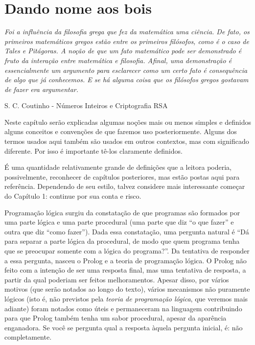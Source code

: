 \documentclass{article}
\begin{document}
\section{Dando nome aos bois}

\epigraph{\textit{Foi a influência da filosofia grega que fez da matemática uma ciência. De fato, os primeiros matemáticos gregos estão entre os primeiros filósofos, como é o caso de Tales e Pitágoras. A noção de que um fato matemático pode ser demonstrado é fruto da interação entre matemática e filosofia. Afinal, uma demonstração é essencialmente um argumento para esclarecer como um certo fato é consequência de algo que já conhecemos. E se há alguma coisa que os filósofos gregos gostavam de
    fazer era argumentar.}}{S. C. Coutinho - Números Inteiros e Criptografia RSA}


Neste capítulo serão explicadas algumas noções mais ou menos simples e definidos alguns conceitos e convenções de que faremos uso posteriormente. Alguns dos termos usados aqui também são usados em outros contextos, mas com significado diferente. Por isso é importante tê-los claramente definidos.

É uma quantidade relativamente grande de definições que a leitora poderia, possivelmente, reconhecer de capítulos posteriores, mas estão postas aqui para referência. Dependendo de seu estilo, talvez considere mais interessante começar do Capítulo 1: continue por sua conta e risco. %

Programação lógica surgiu da constatação de que programas são formados por uma parte lógica e uma parte procedural (uma parte que diz ``o que fazer'' e outra que diz ``como fazer''). Dada essa constatação, uma pergunta natural é ``Dá para separar a parte lógica da procedural, de modo que quem programa tenha que se preocupar somente com a lógica do programa?''. Da tentativa de responder a essa pergunta, nasceu o Prolog e a teoria de programação lógica. O Prolog não
feito com a intenção de ser uma resposta final, mas uma tentativa de resposta, a partir da qual poderiam ser feitos
melhoramentos. Apesar disso, por vários motivos (que serão notados ao longo do texto), vários mecanismos não puramente lógicos (isto é, não previstos pela \textit{teoria de programação lógica}, que veremos mais adiante) foram notados como úteis e permaneceram na linguagem contribuindo para que Prolog também tenha um sabor procedural, apesar da aparência enganadora. Se você se pergunta qual a resposta àquela pergunta inicial, é: não completamente.
\end{document}
